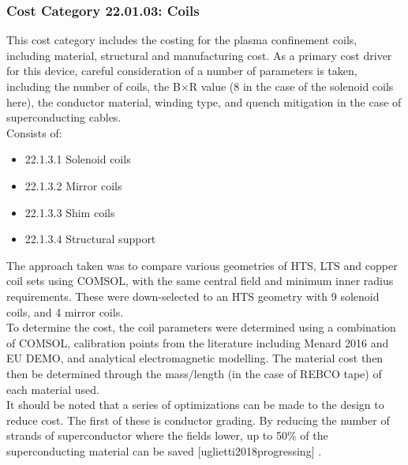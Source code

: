 
\subsubsection*{Cost Category 22.01.03: Coils}

This cost category includes the costing for the plasma confinement coils, including  material, structural and manufacturing cost. As a primary cost driver for this device, careful consideration of a number of parameters is taken, including the number of coils, the B$\times$R value (8 in the case of the solenoid coils here), the conductor material, winding type, and quench mitigation in the case of superconducting cables.\\

Consists of:

\begin{itemize}
    \item 22.1.3.1 Solenoid coils
    \item 22.1.3.2 Mirror coils
    \item 22.1.3.3 Shim coils
    \item 22.1.3.4 Structural support
\end{itemize}


The approach taken was to compare various geometries of HTS, LTS and copper coil sets using COMSOL, with the same central field and minimum inner radius requirements. These were down-selected to an HTS geometry with 9 solenoid coils, and 4 mirror coils.\\

To determine the cost, the coil parameters were determined using a combination of COMSOL, calibration points from the literature including Menard 2016
and EU DEMO, and analytical electromagnetic modelling. The material cost then then be determined through the mass/length (in the case of REBCO tape) of each material used.\\

It should be noted that a series of optimizations can be made to the design to reduce cost. The first of these is conductor grading. By reducing the number of strands of superconductor where the fields lower, up to 50\% of the superconducting material can be saved [uglietti2018progressing]
.\\

